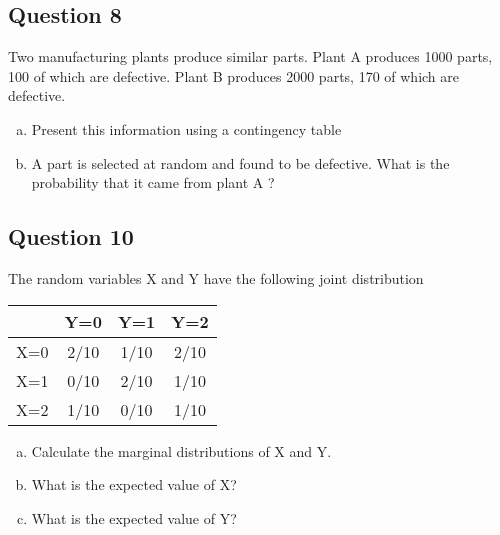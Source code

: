 \documentclass[a4paper,12pt]{article}
\begin{document}
\subsection*{Question 8}
Two manufacturing plants produce similar parts. Plant A produces 1000 parts, 100 of which are defective. Plant B produces 2000 parts, 170 of which are defective. 
\begin{enumerate}[(a)]
    \item 
Present this information using a contingency table
\item
	A part is selected at random and found to be defective. What is the probability that it came from plant A ?
\end{enumerate}
 
\subsection*{Question 10}

The random variables X and Y have the following joint distribution
 \begin{center}
    \begin{tabular}{|c|c|c|c|}
 \hline
	& Y=0	& Y=1 &  Y=2 \\ \hline
X=0	& 2/10	& 1/10	& 2/10 \\ \hline
X=1	& 0/10	& 2/10	& 1/10 \\\hline
X=2	& 1/10	& 0/10	& 1/10\\\hline
\end{tabular}
\end{center}

 \begin{enumerate}[(a)]
    \item 
	Calculate the marginal distributions of X and Y.     
    \item	What is the expected value of X?
    \item	What is the expected value of Y?                 
\end{enumerate} 
              
 
\end{document}
